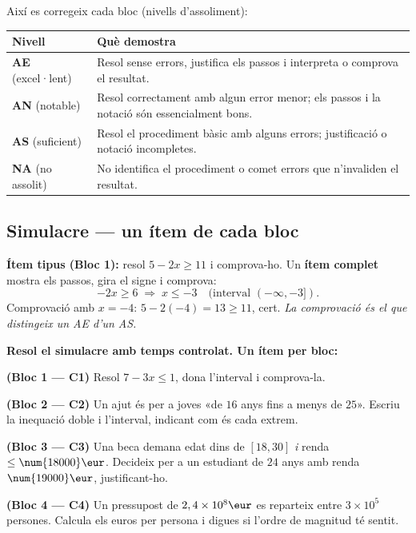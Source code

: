 \noindent Així es corregeix cada bloc (nivells d'assoliment):
\begin{center}
\renewcommand{\arraystretch}{1.3}
\begin{tabular}{p{2.4cm} p{10.2cm}}
\toprule
\textbf{Nivell} & \textbf{Què demostra} \\
\midrule
\textbf{AE} (excel·lent) & Resol sense errors, justifica els passos i interpreta o
comprova el resultat. \\
\textbf{AN} (notable) & Resol correctament amb algun error menor; els passos i la
notació són essencialment bons. \\
\textbf{AS} (suficient) & Resol el procediment bàsic amb alguns errors; justificació
o notació incompletes. \\
\textbf{NA} (no assolit) & No identifica el procediment o comet errors que
n'invaliden el resultat. \\
\bottomrule
\end{tabular}
\end{center}

\subsection{Simulacre — un ítem de cada bloc}

\begin{exemple}
\textbf{Ítem tipus (Bloc 1):} resol $5-2x\ge 11$ i comprova-ho. Un \textbf{ítem
complet} mostra els passos, gira el signe i comprova:
\[
-2x\ge 6 \;\Rightarrow\; x\le -3 \quad(\text{interval } (-\infty,-3]).
\]
Comprovació amb $x=-4$: $5-2(-4)=13\ge 11$, cert. \emph{La comprovació és el que
distingeix un AE d'un AS.}
\end{exemple}

\begin{exercicis}
\textbf{Resol el simulacre amb temps controlat. Un ítem per bloc:}
\begin{exlist}
  \item \textbf{(Bloc 1 — C1)} Resol $7-3x\le 1$, dona l'interval i comprova-la.
  \item \textbf{(Bloc 2 — C2)} Un ajut és per a joves «de $16$ anys fins a menys de
        $25$». Escriu la inequació doble i l'interval, indicant com és cada extrem.
  \item \textbf{(Bloc 3 — C3)} Una beca demana edat dins de $[18,30]$ \emph{i} renda
        $\le\num{18000}\eur$. Decideix per a un estudiant de $24$ anys amb renda
        $\num{19000}\eur$, justificant-ho.
  \item \textbf{(Bloc 4 — C4)} Un pressupost de $2,4\times 10^{8}\eur$ es reparteix
        entre $3\times 10^{5}$ persones. Calcula els euros per persona i digues si
        l'ordre de magnitud té sentit.
\end{exlist}
\end{exercicis}

